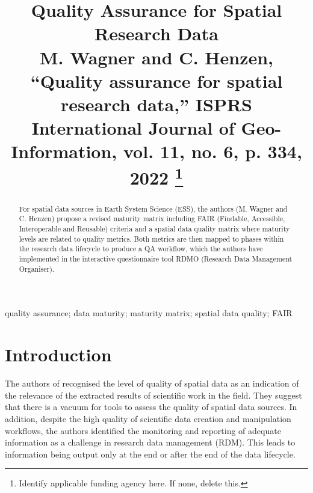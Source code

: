 \documentclass[conference]{IEEEtran}
\begin{document}
\title{Quality Assurance for Spatial Research Data\\
{\footnotesize M. Wagner and C. Henzen, “Quality assurance for spatial research data,”
ISPRS International Journal of Geo-Information, vol. 11, no. 6, p. 334,
2022}
\thanks{Identify applicable funding agency here. If none, delete this.}
}

\author{
\and
{}
\and
{}
}

\maketitle

\begin{abstract}
    For spatial data sources in Earth System Science (ESS), the authors (M. Wagner and C. Henzen) propose a revised maturity matrix including FAIR (Findable, Accessible, Interoperable and Reusable) criteria and a spatial data quality matrix where maturity levels are related to quality metrics. Both metrics are then mapped to phases within the research data lifecycle to produce a QA workflow, which the authors have implemented in the interactive questionnaire tool RDMO (Research Data Management Organiser).
\end{abstract}

\begin{IEEEkeywords}
quality assurance; data maturity; maturity matrix; spatial data quality; FAIR
\end{IEEEkeywords}

\section{Introduction}
The authors of \cite{wagner2022quality} recognised the level of quality of spatial data as an indication of the relevance of the extracted results of scientific work in the field. They suggest that there is a vacuum for tools to assess the quality of spatial data sources. In addition, despite the high quality of scientific data creation and manipulation workflows, the authors identified the monitoring and reporting of adequate information as a challenge in research data management (RDM). This leads to information being output only at the end or after the end of the data lifecycle.
\end{document}
